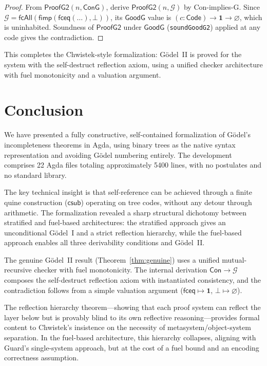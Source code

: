 \documentclass[11pt]{article}
\newcommand{\Code}{\mathsf{Code}}
\newcommand{\csub}{\mathsf{csub}}
\newcommand{\fbot}{\bot}
\newcommand{\fimp}{\mathsf{fimp}}
\newcommand{\fceq}{\mathsf{fceq}}
\newcommand{\fcAll}{\mathsf{fcAll}}
\newcommand{\GS}{\mathcal{G}}
\begin{document}
\begin{proof}
  From $\mathsf{ProofG2}(n, \mathsf{ConG})$, derive
  $\mathsf{ProofG2}(n, \GS)$ by Con-implies-G.
  Since $\GS = \fcAll(\fimp(\fceq(\ldots), \fbot))$, its
  $\mathsf{GoodG}$ value is $(c : \Code) \to \mathbf{1} \to \varnothing$,
  which is uninhabited. Soundness of $\mathsf{ProofG2}$ under
  $\mathsf{GoodG}$ (\texttt{soundGoodG2}) applied at any code gives
  the contradiction.
\end{proof}

This completes the Chwistek-style formalization: G\"odel~II is proved
for the system with the self-destruct reflection axiom, using a
unified checker architecture with fuel monotonicity and a valuation
argument.

\section{Conclusion}
\label{sec:conclusion}

We have presented a fully constructive, self-contained formalization of
G\"odel's incompleteness theorems in Agda, using binary trees as
the native syntax representation and avoiding G\"odel numbering entirely.
The development comprises 22 Agda files totaling approximately 5400
lines, with no postulates and no standard library.

The key technical insight is that self-reference can be achieved through
a finite quine construction ($\csub$) operating on tree codes, without
any detour through arithmetic. The formalization revealed a sharp
structural dichotomy between stratified and fuel-based architectures:
the stratified approach gives an unconditional G\"odel~I and a strict
reflection hierarchy, while the fuel-based approach enables all three
derivability conditions and G\"odel~II.

The genuine G\"odel~II result (Theorem~\ref{thm:genuine}) uses a
unified mutual-recursive checker with fuel monotonicity. The internal
derivation $\mathsf{Con} \to \GS$ composes the self-destruct
reflection axiom with instantiated consistency, and the contradiction
follows from a simple valuation argument ($\fceq \mapsto \mathbf{1}$,
$\fbot \mapsto \varnothing$).

The reflection hierarchy theorem---showing that each proof system can
reflect the layer below but is provably blind to its own reflective
reasoning---provides formal content to Chwistek's insistence on the
necessity of metasystem/object-system separation. In the fuel-based
architecture, this hierarchy collapses, aligning with Guard's
single-system approach, but at the cost of a fuel bound and an encoding
correctness assumption.
\end{document}
